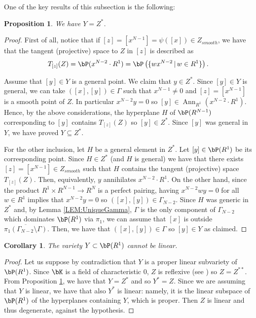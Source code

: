 \documentclass[a4paper,11pt]{amsart}
\newtheorem{corollary}[theorem]{Corollary}
\newtheorem{proposition}[theorem]{Proposition}
\DeclareMathOperator{\Ann}{Ann}
\begin{document}
One of the key results of this subsection is the following:

\begin{proposition}
\label{PROP:DUAL}
We have $Y=Z^*$.
\end{proposition}
\begin{proof}
First of all, notice that if $[z]=[x^{N-1}]=\psi([x])\in Z_{smooth}$, we have that the tangent (projective) space to $Z$ in $[z]$ is described as
$$T_{[z]}(Z)=\bP(x^{N-2}\cdot R^1)=\bP\left(\{wx^{N-2}\,|\, w \in R^1\}\right).$$

Assume that $[y]\in Y$ is a general point. We claim that $y\in Z^*$. Since $[y]\in Y$ is general, we can take $([x],[y])\in \Gamma$ such that $x^{N-1}\neq 0$ and $[z]=[x^{N-1}]$ is a smooth point of $Z$. In particular $x^{N-2}y=0$ so $[y]\in \Ann_{R^1}(x^{N-2}\cdot R^1)$. Hence, by the above considerations, the hyperplane $H$ of $\bP(R^{N-1})$ corresponding to $[y]$ contains $T_{[z]}(Z)$ so $[y]\in Z^*$. Since $[y]$ was general in $Y$, we have proved $Y\subseteq Z^*$.
\vspace{2mm}

For the other inclusion, let $H$ be a general element in $Z^*$. Let $[y]\in \bP(R^1)$ be its corresponding point. Since $H\in Z^*$ (and $H$ is general) we have that there exists $[z]=[x^{N-1}]\in Z_{smooth}$ such that $H$ contains the tangent (projective) space $T_{[z]}(Z)$. Then, equivalently, $y$ annihilates $x^{N-2}\cdot R^1$. On the other hand, since the product $R^1\times R^{N-1}\to R^{N}$ is a perfect pairing, having $x^{N-2}wy=0$ for all $w\in R^1$ implies that $x^{N-2}y=0$ so $([x],[y])\in \Gamma_{N-2}$. Since $H$ was generic in $Z^*$ and, by Lemma \ref{LEM:UniqueGamma}, $\Gamma$ is the only component of $\Gamma_{N-2}$ which dominates $\bP(R^1)$ via $\pi_1$, we can assume that $[x]$ is outside $\overline{\pi_1(\Gamma_{N-2}\setminus \Gamma)}$. Then, we have that $([x],[y])\in \Gamma$ so $[y]\in Y$ as claimed.
\end{proof}

\begin{corollary}
\label{COR:NOLINEAR}
The variety $Y\subset \bP(R^1)$ cannot be linear.
\end{corollary}
\begin{proof}
Let us suppose by contradiction that $Y$ is a proper linear subvariety of $\bP(R^1)$. Since $\bK$ is a field of characteristic $0$, $Z$ is reflexive (see \cite{Wal56,Kle86}) so $Z=Z^{**}$. From Proposition \ref{PROP:DUAL}, we have that $Y=Z^*$ and so $Y^*=Z$.
Since we are assuming that $Y$ is linear, we have that also $Y^*$ is linear: namely, it is the linear subspace of $\bP(R^1)$ of the hyperplanes containing $Y$, which is proper. Then $Z$ is linear and thus degenerate, against the hypothesis.
\end{proof}
\end{document}
